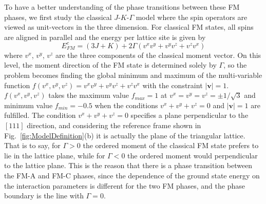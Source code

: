 \documentclass[aps,prb,reprint,amsfonts,amsmath,amssymb,showpacs,groupedaddress,superscriptaddress]{revtex4-1}
\begin{document}
To have a better understanding of the phase transitions between these FM phases, we first study the classical $J$-$K$-$\Gamma$ model where the spin operators are viewed as unit-vectors in the three dimension. For classical FM states, all spins are aligned in parallel and the energy per lattice site is given by
\begin{equation}
    E_{FM}^{c} = (3J + K) + 2 \Gamma (v^x v^y + v^y v^z + v^z v^x) \label{eq:EcFM}
\end{equation}
where $v^x$, $v^y$, $v^z$ are the three components of the classical moment vector. On this level, the moment direction of the FM state is determined solely by $\Gamma$, so the problem becomes finding the global minimum and maximum of the multi-variable function $f(v^x, v^y, v^z) = v^x v^y + v^y v^z + v^z v^x$ with the constraint $|\bm{v}| = 1$. $f(v^x, v^y, v^z)$ takes the maximum value $f_{max}=1$ at $v^x=v^y=v^z=\pm 1/\sqrt{3}$ and minimum value $f_{min}=-0.5$ when the conditions $v^x + v^y + v^z = 0$ and $|\bm{v}| = 1$ are fulfilled. The condition $v^x + v^y + v^z = 0$ specifies a plane perpendicular to the $[111]$ direction, and considering the reference frame shown in Fig.~\ref{fig:ModelDefinition}(b) it is actually the plane of the triangular lattice. That is to say, for $\Gamma > 0$ the ordered moment of the classical FM state prefers to lie in the lattice plane, while for $\Gamma<0$ the ordered moment would perpendicular to the lattice plane. This is the reason that there is a phase transition between the FM-A and FM-C phases, since the dependence of the ground state energy on the interaction parameters is different for the two FM phases, and the phase boundary is the line with $\Gamma=0$.
\end{document}
